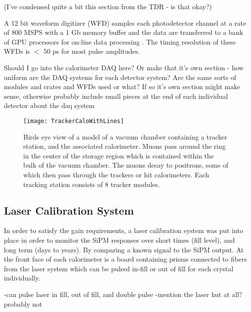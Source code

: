 (I've condensed quite a bit this section from the TDR - is that okay?)

A 12 bit waveform digitizer (WFD) samples each photodetector channel at a rate of 800 MSPS with a 1 Gb memory buffer and the data are transferred to a bank of GPU processors for on-line data processing \cite{Sweigart:2016jty}. The timing resolution of these WFDs is $<$ 50 ps for most pulse amplitudes.

Should I go into the calorimeter DAQ here? Or make that it's own section - how uniform are the DAQ systems for each detector system? Are the same sorts of modules and crates and WFDs used or what? If so it's own section might make sense, otherwise probably include small pieces at the end of each individual detector about the daq system

\begin{figure}[]
    \centering
    \texttt{[image: TrackerCaloWithLines]}
    \caption[TrackerCaloWithLines]{Birds eye view of a model of a vacuum chamber containing a tracker station, and the associated calorimeter. Muons pass around the ring in the center of the storage region which is contained within the bulk of the vacuum chamber. The muons decay to positrons, some of which then pass through the trackers or hit calorimeters. Each tracking station consists of 8 tracker modules.}   
    \label{fig:TrackerCaloWithLines}
\end{figure}



\subsection{Laser Calibration System}
\label{LaserCalibrationSystem}

In order to satisfy the gain requirements, a laser calibration system was put into place in order to monitor the SiPM responses over short times (fill level), and long term (days to years). By comparing a known signal to the SiPM output. At the front face of each calorimeter is a board containing prisms connected to fibers from the laser system which can be pulsed in-fill or out of fill for each crystal individually. 


-can pulse laser in fill, out of fill, and double pulse
-mention the laser hut at all? probably not


\cite{Anastasi:2015ssy}
\cite{Anastasi:2016luh}
\cite{Anastasi:2017sos}




